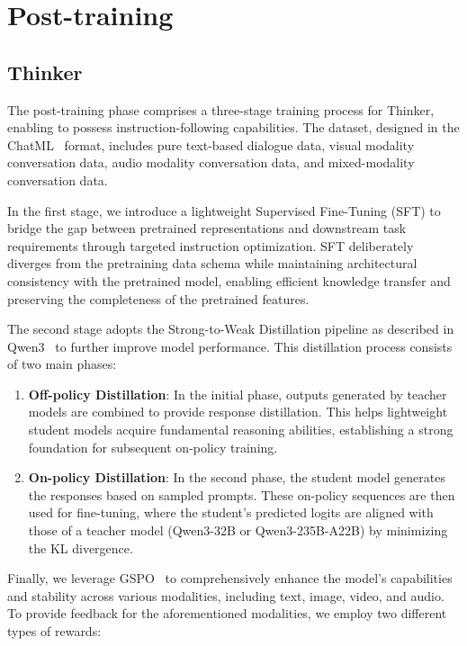 \section{Post-training}\label{sec:post}
\subsection{Thinker}

The post-training phase comprises a three-stage training process for Thinker, enabling \method to possess instruction-following capabilities. The dataset, designed in the ChatML~\citep{chatml} format, includes pure text-based dialogue data, visual modality conversation data, audio modality conversation data, and mixed-modality conversation data.

In the first stage, we introduce a lightweight Supervised Fine-Tuning (SFT) to bridge the gap between pretrained representations and downstream task requirements through targeted instruction optimization. SFT deliberately diverges from the pretraining data schema while maintaining architectural consistency with the pretrained model, enabling efficient knowledge transfer and preserving the completeness of the pretrained features.

The second stage adopts the Strong-to-Weak Distillation pipeline as described in Qwen3~\citep{qwen3} to further improve model performance. This distillation process consists of two main phases:

\begin{enumerate}[label=(\arabic*)]
    \item \textbf{Off-policy Distillation}: In the initial phase, outputs generated by teacher models are combined to provide response distillation. This helps lightweight student models acquire fundamental reasoning abilities, establishing a strong foundation for subsequent on-policy training.
    \item \textbf{On-policy Distillation}: In the second phase, the student model generates the responses based on sampled prompts. These on-policy sequences are then used for fine-tuning, where the student’s predicted logits are aligned with those of a teacher model (Qwen3-32B or Qwen3-235B-A22B) by minimizing the KL divergence.
\end{enumerate}





Finally, we leverage GSPO~\citep{gspo} to comprehensively enhance the model's capabilities and stability across various modalities, including text, image, video, and audio. To provide feedback for the aforementioned modalities, we employ two different types of rewards:

